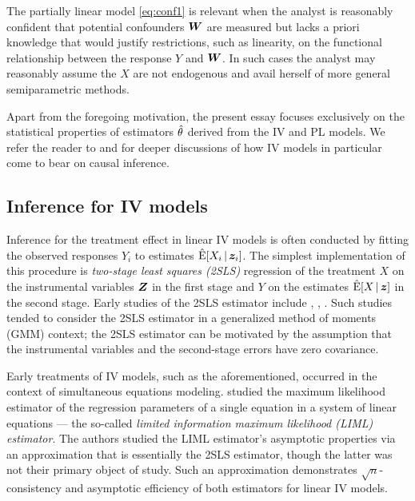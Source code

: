\documentclass{uwstat572}
\theoremstyle{definition}
\theoremstyle{remark}
\newcommand{\E}{\mathrm{E}}
\newcommand{\Ehat}{\hat{\E}}
\numberwithin{equation}{section}
\begin{document}

The partially linear model \ref{eq:conf1} is relevant when the analyst is reasonably confident that potential confounders $\boldsymbol{W}$ are measured but lacks a priori knowledge that would justify restrictions, such as linearity, on the functional relationship between the response $Y$ and $\boldsymbol{W}$. In such cases the analyst may reasonably assume the $X$ are not endogenous and avail herself of more general semiparametric methods.

Apart from the foregoing motivation, the present essay focuses exclusively on the statistical properties of estimators $\hat{\theta}$ derived from the IV and PL models. We refer the reader to \cite[Chapter 5]{P09} and \cite{AK01} for deeper discussions of how IV models in particular come to bear on causal inference. 



%

\subsection{Inference for IV models}\label{ss:inf}

Inference for the treatment effect in linear IV models is often conducted by fitting the observed responses $Y_i$ to estimates $\Ehat[X_i\,|\,\z_i]$. The simplest implementation of this procedure is \emph{two-stage least squares (2SLS)} regression of the treatment $X$ on the instrumental variables $\boldsymbol{Z}$ in the first stage and $Y$ on the estimates $\Ehat[X\,|\,\z]$ in the second stage. Early studies of the 2SLS estimator include \cite{T53}, \cite{B57}, \cite{S58}. Such studies tended to consider the 2SLS estimator in a generalized method of moments (GMM) context; the 2SLS estimator can be motivated by the assumption that the instrumental variables and the second-stage errors have zero covariance. 

Early treatments of IV models, such as the aforementioned, occurred in the context of simultaneous equations modeling. \cite{AR50} studied the maximum likelihood estimator of the regression parameters of a single equation in a system of linear equations --- the so-called \emph{limited information maximum likelihood (LIML) estimator}. The authors studied the LIML estimator's asymptotic properties via an approximation that is essentially the 2SLS estimator, though the latter was not their primary object of study. Such an approximation demonstrates $\sqrt{n}$-consistency and asymptotic efficiency of both estimators for linear IV models.
\end{document}
